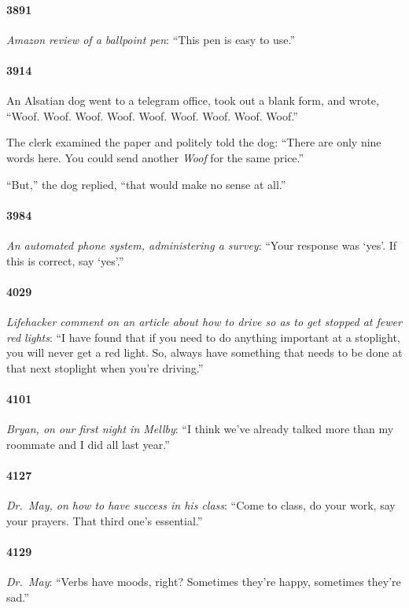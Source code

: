 \documentclass[10pt]{memoir}
\newcommand{\intro}[1]{\emph{#1}}
\begin{document}
\paragraph{3891} \intro{Amazon review of a ballpoint pen}: ``This pen is easy to use.''

\paragraph{3914} An Alsatian dog went to a telegram office, took out a blank form, and wrote, “Woof. Woof. Woof. Woof. Woof. Woof. Woof. Woof. Woof.”

The clerk examined the paper and politely told the dog: “There are only nine words here. You could send another \emph{Woof} for the same price.”

“But,” the dog replied, “that would make no sense at all.”
\paragraph{3984} \intro{An automated phone system, administering a survey}: ``Your response was `yes'. If this is correct, say `yes'.''

\paragraph{4029} \intro{Lifehacker comment on an article about how to drive so as to get stopped at fewer red lights}: ``I have found that if you need to do anything important at a stoplight, you will never get a red light. So, always have something that needs to be done at that next stoplight when you're driving.''

\paragraph{4101} \intro{Bryan, on our first night in Mellby}: ``I think we've already talked more than my roommate and I did all last year.''

\paragraph{4127} \intro{Dr.\ May, on how to have success in his class}: ``Come to class, do your work, say your prayers. That third one's essential.''

\paragraph{4129} \intro{Dr.\ May}: ``Verbs have moods, right? Sometimes they're happy, sometimes they're sad.''
\end{document}

